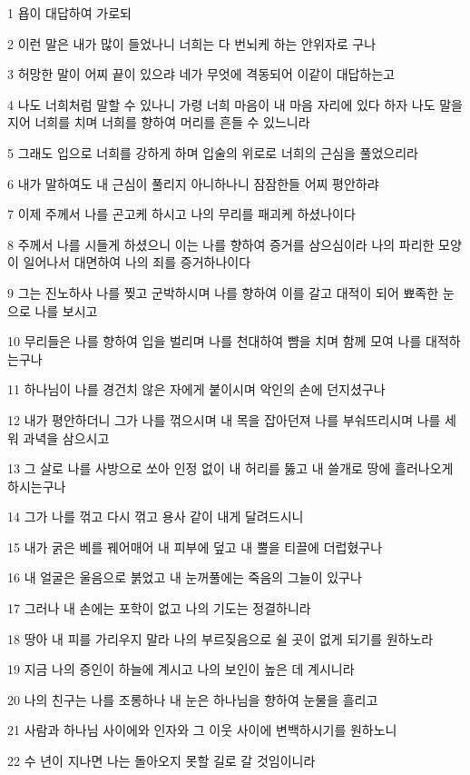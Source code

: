 \par 1 욥이 대답하여 가로되
\par 2 이런 말은 내가 많이 들었나니 너희는 다 번뇌케 하는 안위자로 구나
\par 3 허망한 말이 어찌 끝이 있으랴 네가 무엇에 격동되어 이같이 대답하는고
\par 4 나도 너희처럼 말할 수 있나니 가령 너희 마음이 내 마음 자리에 있다 하자 나도 말을 지어 너희를 치며 너희를 향하여 머리를 흔들 수 있느니라
\par 5 그래도 입으로 너희를 강하게 하며 입술의 위로로 너희의 근심을 풀었으리라
\par 6 내가 말하여도 내 근심이 풀리지 아니하나니 잠잠한들 어찌 평안하랴
\par 7 이제 주께서 나를 곤고케 하시고 나의 무리를 패괴케 하셨나이다
\par 8 주께서 나를 시들게 하셨으니 이는 나를 향하여 증거를 삼으심이라 나의 파리한 모양이 일어나서 대면하여 나의 죄를 증거하나이다
\par 9 그는 진노하사 나를 찢고 군박하시며 나를 향하여 이를 갈고 대적이 되어 뾰족한 눈으로 나를 보시고
\par 10 무리들은 나를 향하여 입을 벌리며 나를 천대하여 뺨을 치며 함께 모여 나를 대적하는구나
\par 11 하나님이 나를 경건치 않은 자에게 붙이시며 악인의 손에 던지셨구나
\par 12 내가 평안하더니 그가 나를 꺾으시며 내 목을 잡아던져 나를 부숴뜨리시며 나를 세워 과녁을 삼으시고
\par 13 그 살로 나를 사방으로 쏘아 인정 없이 내 허리를 뚫고 내 쓸개로 땅에 흘러나오게 하시는구나
\par 14 그가 나를 꺾고 다시 꺾고 용사 같이 내게 달려드시니
\par 15 내가 굵은 베를 꿰어매어 내 피부에 덮고 내 뿔을 티끌에 더럽혔구나
\par 16 내 얼굴은 울음으로 붉었고 내 눈꺼풀에는 죽음의 그늘이 있구나
\par 17 그러나 내 손에는 포학이 없고 나의 기도는 정결하니라
\par 18 땅아 내 피를 가리우지 말라 나의 부르짖음으로 쉴 곳이 없게 되기를 원하노라
\par 19 지금 나의 증인이 하늘에 계시고 나의 보인이 높은 데 계시니라
\par 20 나의 친구는 나를 조롱하나 내 눈은 하나님을 향하여 눈물을 흘리고
\par 21 사람과 하나님 사이에와 인자와 그 이웃 사이에 변백하시기를 원하노니
\par 22 수 년이 지나면 나는 돌아오지 못할 길로 갈 것임이니라

